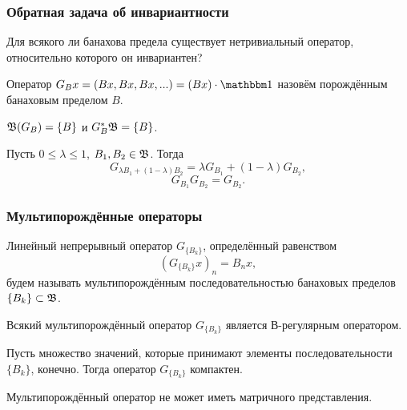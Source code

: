 \begin{frame}\frametitle{{Обратная задача об инвариантности}}
	Для всякого ли банахова предела существует нетривиальный оператор, относительно которого он инвариантен?
	\vfill
	\begin{ddefinition}
		Оператор $G_B x = (Bx, Bx, Bx, ...) = (Bx)\cdot\one$
		назовём порождённым банаховым пределом $B$.
	\end{ddefinition}
	\vfill
	\begin{ttheorem}
		$\mathfrak{B}(G_B) = \{B\}$ и $G_B^* \mathfrak{B} = \{B\}$.
	\end{ttheorem}
	\vfill
	\begin{llemma}
		Пусть $0 \leq \lambda \leq 1$, $B_1, B_2 \in \mathfrak{B}$.
		Тогда
		\begin{equation}
			G_{\lambda B_1+(1-\lambda) B_2} =\lambda G_{B_1} + (1-\lambda)G_{B_2}
			,
		\end{equation}
		\begin{equation}
			G_{B_1} G_{B_2} = G_{B_2}
			.
		\end{equation}
	\end{llemma}
\end{frame}


\begin{frame}\frametitle{{Мультипорождённые операторы}}
	\begin{ddefinition}
		Линейный непрерывный оператор $G_{\{B_k\}}$, определённый равенством
		\begin{equation}
			(G_{\{B_k\}}x)_n = B_n x
			,
		\end{equation}
		будем называть мультипорождённым последовательностью банаховых пределов $\{B_k\}\subset \mathfrak{B}$.
	\end{ddefinition}
	\vfill

	\begin{llemma}
		Всякий мультипорождённый оператор $G_{\{B_k\}}$ является В-регулярным оператором.
	\end{llemma}
	\vfill

	\begin{llemma}
		Пусть множество значений, которые принимают элементы последовательности ${\{B_k\}}$, конечно.
		Тогда оператор $G_{\{B_k\}}$ компактен.
	\end{llemma}
	\vfill

	\begin{ttheorem}
		Мультипорождённый оператор не может иметь матричного представления.
	\end{ttheorem}

\end{frame}


